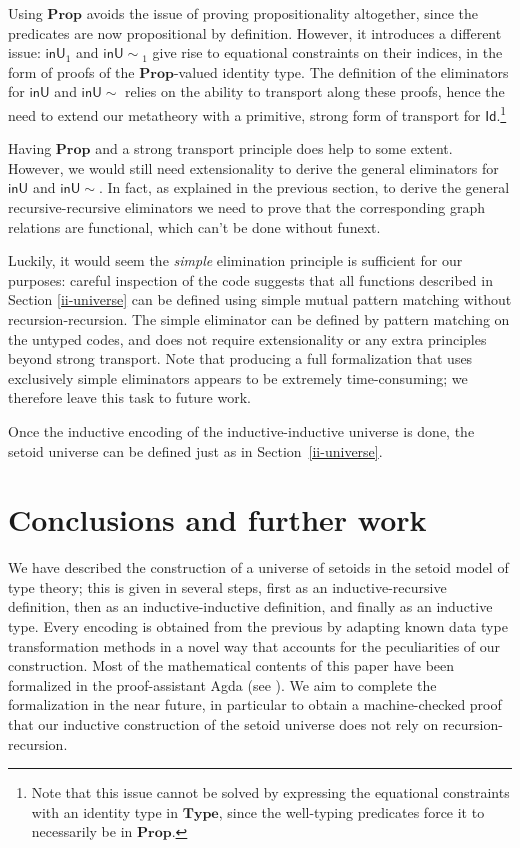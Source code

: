 \documentclass[autoref]{llncs}
\newcommand{\inU}{\mathsf{inU}}
\newcommand{\inUU}{\mathsf{inU{\sim}}}
\newcommand{\mType}{\mathbf{Type}}
\newcommand{\mProp}{\mathbf{Prop}}
\begin{document}
Using $\mProp$ avoids the issue of proving propositionality altogether, since the
predicates are now propositional by definition.
%
However, it introduces a different issue: $\inU_1$ and $\inUU_1$ give
rise to equational constraints on their indices, in the form of proofs of the
$\mProp$-valued identity type. The definition of the eliminators for $\inU$
and $\inUU$ relies on the ability to transport along these proofs, hence
the need to extend our metatheory with a primitive, strong form of transport for
$\textsf{Id}$.\footnote{Note that this issue cannot be solved by expressing the
  equational constraints with an identity type in $\mType$, since the
  well-typing predicates force it to necessarily be in $\mProp$.}

Having $\mProp$ and a strong transport principle does help to some extent.
%
However, we would still need extensionality to derive the general eliminators
for $\inU$ and $\inUU$. In fact, as explained in the previous section,
to derive the general recursive-recursive eliminators we need to prove that the
corresponding graph relations are functional, which can't be done without funext.

Luckily, it would seem the \emph{simple} elimination principle is sufficient for
our purposes: careful inspection of the code suggests that all functions
described in Section \ref{ii-universe} can be defined using simple mutual
pattern matching without recursion-recursion. The simple eliminator can be
defined by pattern matching on the untyped codes, and does not require
extensionality or any extra principles beyond strong transport. Note that
producing a full formalization that uses exclusively simple eliminators appears
to be extremely time-consuming; we therefore leave this task to future work.

Once the inductive encoding of the inductive-inductive universe is done, the
setoid universe can be defined just as in Section~\ref{ii-universe}.

\section{Conclusions and further work}\label{further-work}

We have described the construction of a universe of setoids in the setoid model
of type theory; this is given in several steps, first as an inductive-recursive
definition, then as an inductive-inductive definition, and finally as an
inductive type. Every encoding is obtained from the previous by adapting known
data type transformation methods in a novel way that accounts for the
peculiarities of our construction.
%
Most of the mathematical contents of this paper have been formalized in the
proof-assistant Agda (see \cite{agda-code}). We aim to complete the
formalization in the near future, in particular to obtain a machine-checked
proof that our inductive construction of the setoid universe does not rely on
recursion-recursion.
\end{document}
